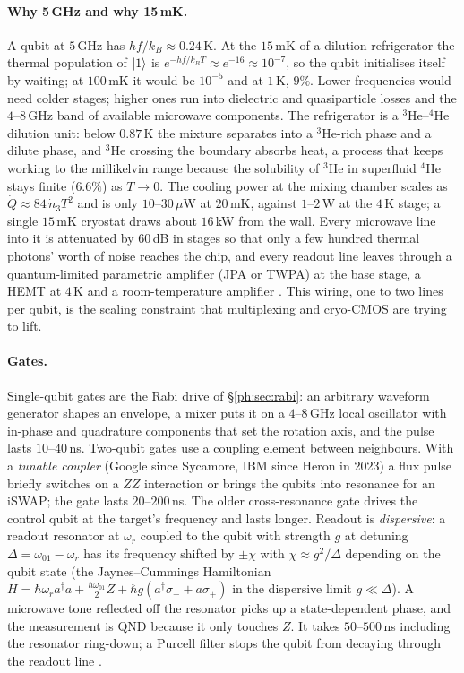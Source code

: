 \paragraph{Why 5\,GHz and why 15\,mK.} A qubit at $5$\,GHz has $hf/k_B\approx0.24$\,K. At the
$15$\,mK of a dilution refrigerator the thermal population of $\lvert 1 \rangle$ is $e^{-hf/k_BT}\approx
e^{-16}\approx10^{-7}$, so the qubit initialises itself by waiting; at $100$\,mK it would be
$10^{-5}$ and at $1$\,K, $9\%$. Lower frequencies would need colder stages; higher ones run into
dielectric and quasiparticle losses and the $4$--$8$\,GHz band of available microwave components.
The refrigerator is a $^3$He--$^4$He dilution unit: below $0.87$\,K the mixture separates into a
$^3$He-rich phase and a dilute phase, and $^3$He crossing the boundary absorbs heat, a process
that keeps working to the millikelvin range because the solubility of $^3$He in superfluid $^4$He
stays finite ($6.6\%$) as $T\to0$. The cooling power at the mixing chamber scales as
$\dot Q\approx84\,\dot n_3T^2$ and is only $10$--$30\,\mu$W at $20$\,mK, against $1$--$2$\,W at the
$4$\,K stage; a single $15$\,mK cryostat draws about $16$\,kW from the wall. Every microwave line
into it is attenuated by $60$\,dB in stages so that only a few hundred thermal photons' worth of
noise reaches the chip, and every readout line leaves through a quantum-limited parametric
amplifier (JPA or TWPA) at the base stage, a HEMT at $4$\,K and a room-temperature amplifier
\cite{ph:uqt26}. This wiring, one to two lines per qubit, is the scaling constraint that
multiplexing and cryo-CMOS are trying to lift.

\paragraph{Gates.} Single-qubit gates are the Rabi drive of \S\ref{ph:sec:rabi}: an arbitrary
waveform generator shapes an envelope, a mixer puts it on a $4$--$8$\,GHz local oscillator with
in-phase and quadrature components that set the rotation axis, and the pulse lasts $10$--$40$\,ns.
Two-qubit gates use a coupling element between neighbours. With a \emph{tunable coupler} (Google
since Sycamore, IBM since Heron in 2023) a flux pulse briefly switches on a $ZZ$ interaction
or brings the qubits into resonance for an iSWAP; the gate lasts $20$--$200$\,ns. The older
cross-resonance gate drives the control qubit at the target's frequency and lasts longer. Readout
is \emph{dispersive}: a readout resonator at $\omega_r$ coupled to the qubit with strength $g$ at
detuning $\Delta=\omega_{01}-\omega_r$ has its frequency shifted by $\pm\chi$ with
$\chi\approx g^2/\Delta$ depending on the qubit state (the Jaynes--Cummings Hamiltonian
$H=\hbar\omega_ra^\dagger a+\tfrac{\hbar\omega_{01}}2Z+\hbar g(a^\dagger\sigma_-+a\sigma_+)$ in the
dispersive limit $g\ll\Delta$). A microwave tone reflected off the resonator picks up a
state-dependent phase, and the measurement is QND because it only touches $Z$. It takes
$50$--$500$\,ns including the resonator ring-down; a Purcell filter stops the qubit from decaying
through the readout line \cite{ph:uqt26}.

